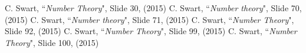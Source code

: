 \begin{thebibliography}{99}

C. Swart, ``{\it Number Theory}", Slide 30, (2015)
C. Swart, ``{\it Number theory}", Slide 70, (2015)
C. Swart, ``{\it Number theory}", Slide 71, (2015)
C. Swart, ``{\it Number Theory}", Slide 92, (2015)
C. Swart, ``{\it Number Theory}", Slide 99, (2015) 
C. Swart, ``{\it Number Theory}", Slide 100, (2015)

\end{thebibliography}
